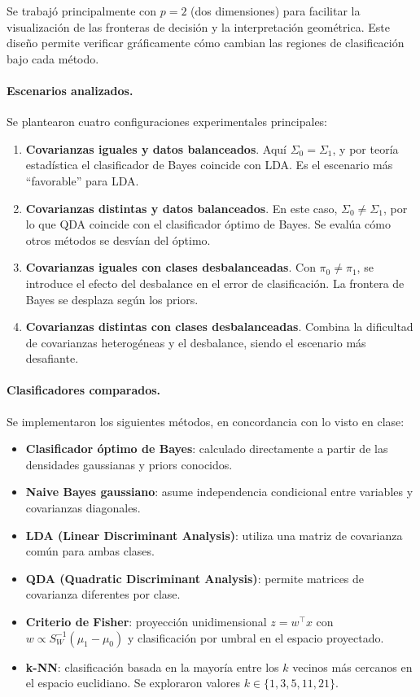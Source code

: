 \documentclass[10pt]{article}
\begin{document}
Se trabajó principalmente con $p=2$ (dos dimensiones) para facilitar la visualización de las fronteras de decisión y la interpretación geométrica. Este diseño permite verificar gráficamente cómo cambian las regiones de clasificación bajo cada método.

\paragraph{Escenarios analizados.}
Se plantearon cuatro configuraciones experimentales principales:
\begin{enumerate}
    \item \textbf{Covarianzas iguales y datos balanceados}. Aquí $\Sigma_0 = \Sigma_1$, y por teoría estadística el clasificador de Bayes coincide con LDA. Es el escenario más “favorable” para LDA.
    \item \textbf{Covarianzas distintas y datos balanceados}. En este caso, $\Sigma_0 \neq \Sigma_1$, por lo que QDA coincide con el clasificador óptimo de Bayes. Se evalúa cómo otros métodos se desvían del óptimo.
    \item \textbf{Covarianzas iguales con clases desbalanceadas}. Con $\pi_0 \neq \pi_1$, se introduce el efecto del desbalance en el error de clasificación. La frontera de Bayes se desplaza según los priors.
    \item \textbf{Covarianzas distintas con clases desbalanceadas}. Combina la dificultad de covarianzas heterogéneas y el desbalance, siendo el escenario más desafiante.
\end{enumerate}

\paragraph{Clasificadores comparados.}
Se implementaron los siguientes métodos, en concordancia con lo visto en clase:
\begin{itemize}
    \item \textbf{Clasificador óptimo de Bayes}: calculado directamente a partir de las densidades gaussianas y priors conocidos.
    \item \textbf{Naive Bayes gaussiano}: asume independencia condicional entre variables y covarianzas diagonales.
    \item \textbf{LDA (Linear Discriminant Analysis)}: utiliza una matriz de covarianza común para ambas clases.
    \item \textbf{QDA (Quadratic Discriminant Analysis)}: permite matrices de covarianza diferentes por clase.
    \item \textbf{Criterio de Fisher}: proyección unidimensional $z=w^\top x$ con $w \propto S_W^{-1}(\mu_1 - \mu_0)$ y clasificación por umbral en el espacio proyectado.
    \item \textbf{k-NN}: clasificación basada en la mayoría entre los $k$ vecinos más cercanos en el espacio euclidiano. Se exploraron valores $k \in \{1, 3, 5, 11, 21\}$.
\end{itemize}
\end{document}
